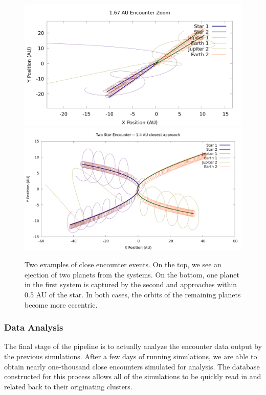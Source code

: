 \documentclass[12pt]{article}
\begin{document}
    \begin{figure}[H]
        \centering
        \caption{Two examples of close encounter events. On the top, we see
            an ejection of two planets from the systems. On the bottom, one planet
            in the first system is captured by the second and approaches 
            within 0.5 AU of the star. In both cases, the
            orbits of the remaining planets become more eccentric.
        }
        \includegraphics[width=5in]{1_67_AU_zoom}
        \includegraphics[width=5in]{1.4AU/1_4_AU_encounter_plot}
    \end{figure}

    \subsubsection{Data Analysis}

    The final stage of the pipeline is to actually analyze the encounter data 
    output by the previous simulations. After a few days of running simulations,
    we are able to obtain nearly one-thousand %
    close encounters simulated
    for analysis. The database constructed for this process allows all of the
    simulations to be quickly read in and related back to their originating clusters.
\end{document}
